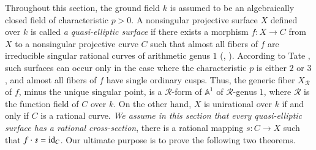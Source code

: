 Throughout this section, the ground field $k$ is assumed to be an
algebraically closed field of characteristic $p>0$. A nonsingular
projective surface $X$ defined over $k$ is called {\em a
  quasi-elliptic surface} if there exists a morphism $f:X\to C$ from
$X$ to a nonsingular projective curve $C$ such that almost all fibers
of $f$ are irreducible singular rational curves of arithmetic genus
$1$ (\cf \cite{9}, \cite{39}). According to Tate \cite{55}, such
surfaces can occur only in the case where the characteristic $p$ is
either $2$ or $3$, and almost all fibers of $f$ have single ordinary
cusps. Thus, the generic fiber $X_{\mathscr{R}}$ of $f$, minus the
unique singular point, is a $\mathscr{R}$-form of $\mathbb{A}^{1}$ of
$\mathscr{R}$-genus $1$, where $\mathscr{R}$ is the function field of
$C$ over $k$. On the other hand, $X$ is unirational over $k$ if and
only if $C$ is a rational curve. {\em We assume in this section that
  every quasi-elliptic surface has a rational cross-section}, \iec
there is a rational mapping $s:C\to X$ such that $f\cdot
s=\operatorname{id}_{C}$. Our ultimate purpose is to prove the following two
theorems.

